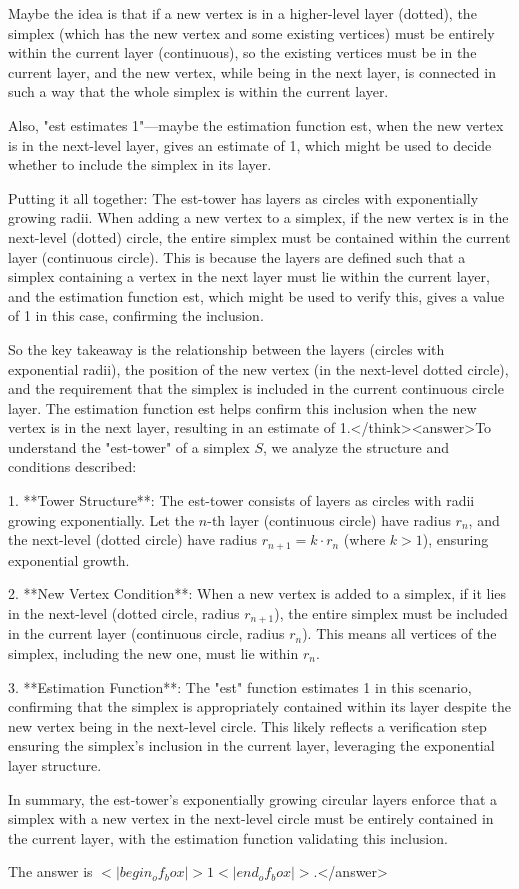 Maybe the idea is that if a new vertex is in a higher-level layer (dotted), the simplex (which has the new vertex and some existing vertices) must be entirely within the current layer (continuous), so the existing vertices must be in the current layer, and the new vertex, while being in the next layer, is connected in such a way that the whole simplex is within the current layer. 

Also, "est estimates 1"—maybe the estimation function est, when the new vertex is in the next-level layer, gives an estimate of 1, which might be used to decide whether to include the simplex in its layer. 

Putting it all together: The est-tower has layers as circles with exponentially growing radii. When adding a new vertex to a simplex, if the new vertex is in the next-level (dotted) circle, the entire simplex must be contained within the current layer (continuous circle). This is because the layers are defined such that a simplex containing a vertex in the next layer must lie within the current layer, and the estimation function est, which might be used to verify this, gives a value of 1 in this case, confirming the inclusion. 

So the key takeaway is the relationship between the layers (circles with exponential radii), the position of the new vertex (in the next-level dotted circle), and the requirement that the simplex is included in the current continuous circle layer. The estimation function est helps confirm this inclusion when the new vertex is in the next layer, resulting in an estimate of 1.</think><answer>To understand the "est-tower" of a simplex \( S \), we analyze the structure and conditions described:  

1. **Tower Structure**: The est-tower consists of layers as circles with radii growing exponentially. Let the \( n \)-th layer (continuous circle) have radius \( r_n \), and the next-level (dotted circle) have radius \( r_{n+1} = k \cdot r_n \) (where \( k > 1 \)), ensuring exponential growth.  

2. **New Vertex Condition**: When a new vertex is added to a simplex, if it lies in the next-level (dotted circle, radius \( r_{n+1} \)), the entire simplex must be included in the current layer (continuous circle, radius \( r_n \)). This means all vertices of the simplex, including the new one, must lie within \( r_n \).  

3. **Estimation Function**: The "est" function estimates 1 in this scenario, confirming that the simplex is appropriately contained within its layer despite the new vertex being in the next-level circle. This likely reflects a verification step ensuring the simplex’s inclusion in the current layer, leveraging the exponential layer structure.  

In summary, the est-tower’s exponentially growing circular layers enforce that a simplex with a new vertex in the next-level circle must be entirely contained in the current layer, with the estimation function validating this inclusion.  

The answer is \(<|begin_of_box|>1<|end_of_box|>\).</answer>
